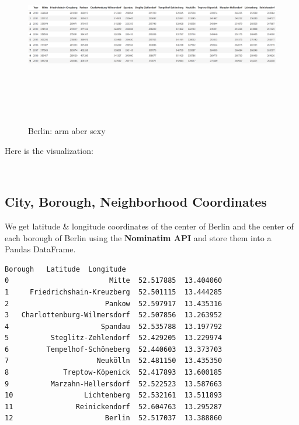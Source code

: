 \documentclass[11pt]{article}
\makeatletter
\newcommand{\boxspacing}{\kern\kvtcb@left@rule\kern\kvtcb@boxsep}
\newcommand{\prompt}[4]{
        {\ttfamily\llap{{\color{#2}[#3]:\hspace{3pt}#4}}\vspace{-\baselineskip}}
    }
\makeatother
\begin{document}
 \begin{figure}
\centering
\includegraphics[width=17cm, height=8cm]{"Screenshot (29).png"}
\caption{Berlin: arm aber sexy}
\end{figure}

Here is the visualization:

    \begin{center}
    \end{center}
    { \hspace*{\fill} \\}
    
    \hypertarget{city-borough-neighborhood-coordinates}{%
\subsection{City, Borough, Neighborhood
Coordinates}\label{city-borough-neighborhood-coordinates}}

We get latitude \& longitude coordinates of the center of Berlin and
the center of each borough of Berlin using the \textbf{Nominatim API}
and store them into a Pandas DataFrame.

                \begin{tcolorbox}[breakable, size=fbox, boxrule=.5pt, pad at break*=1mm, opacityfill=0]
\begin{Verbatim}[commandchars=\\\{\}]
                       Borough   Latitude  Longitude
0                        Mitte  52.517885  13.404060
1     Friedrichshain-Kreuzberg  52.501115  13.444285
2                       Pankow  52.597917  13.435316
3   Charlottenburg-Wilmersdorf  52.507856  13.263952
4                      Spandau  52.535788  13.197792
5          Steglitz-Zehlendorf  52.429205  13.229974
6         Tempelhof-Schöneberg  52.440603  13.373703
7                     Neukölln  52.481150  13.435350
8             Treptow-Köpenick  52.417893  13.600185
9          Marzahn-Hellersdorf  52.522523  13.587663
10                 Lichtenberg  52.532161  13.511893
11               Reinickendorf  52.604763  13.295287
12                      Berlin  52.517037  13.388860
\end{Verbatim}
\end{tcolorbox}
        
\end{document}
